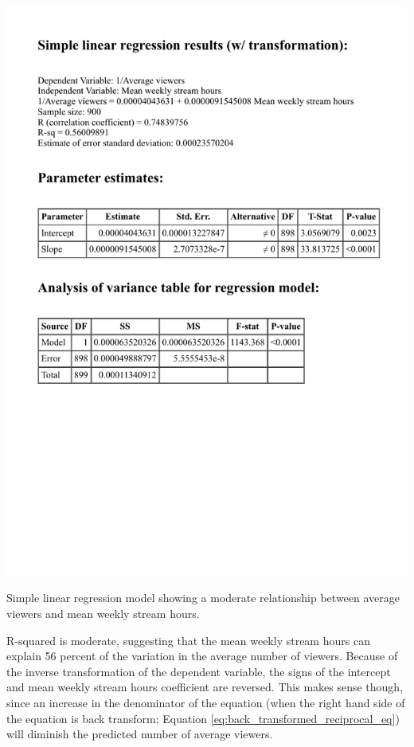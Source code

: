 \documentclass[12pt]{article}
\begin{document}
\begin{table}[!ht]
  \centering %
  \includegraphics[scale=1]{../StatCrunch_Results/reciprocal/regression_table}
  \captionsetup{justification=raggedright, singlelinecheck=false, margin=2cm}
  \caption[Regression: Average Viewers Predicted by Stream Hours]{Simple linear regression model showing a moderate relationship between average viewers and mean weekly stream hours.}
  \label{table:reciprocal_regression_table}
\end{table}

R-squared is moderate, suggesting that the mean weekly stream hours can explain 56 percent of the variation in the average number of viewers. Because of the inverse transformation of the dependent variable, the signs of the intercept and mean weekly stream hours coefficient are reversed. This makes sense though, since an increase in the denominator of the equation (when the right hand side of the equation is back transform; Equation \ref{eq:back_transformed_reciprocal_eq}) will diminish the predicted number of average viewers.
\end{document}
